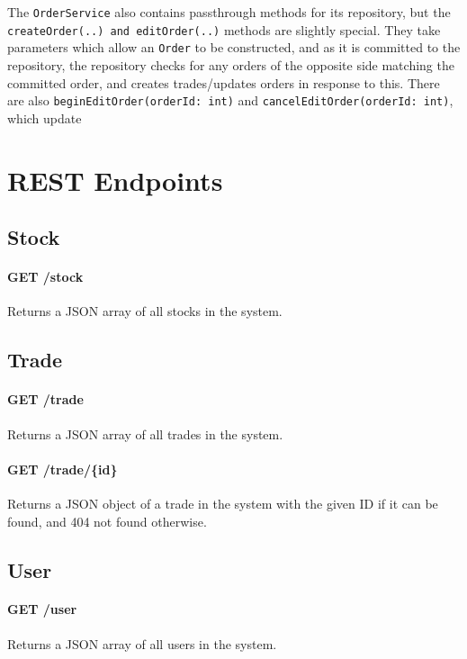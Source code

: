 \documentclass{article}
\begin{document}
The \texttt{OrderService} also contains passthrough methods for its repository, but the \texttt{createOrder(..) and \texttt{editOrder(..)}} methods are slightly special. They take parameters which allow an \texttt{Order} to be constructed, and as it is committed to the repository, the repository checks for any orders of the opposite side matching the committed order, and creates trades/updates orders in response to this. There are also \texttt{beginEditOrder(orderId: int)} and \texttt{cancelEditOrder(orderId: int)}, which update

\section{REST Endpoints}

\subsection{Stock}

\paragraph{GET /stock} Returns a JSON array of all stocks in the system.

\subsection{Trade}

\paragraph{GET /trade} Returns a JSON array of all trades in the system.

\paragraph{GET /trade/\{id\}} Returns a JSON object of a trade in the system with the given ID if it can be found, and 404 not found otherwise. 
 
\subsection{User}

\paragraph{GET /user} Returns a JSON array of all users in the system.
\end{document}
